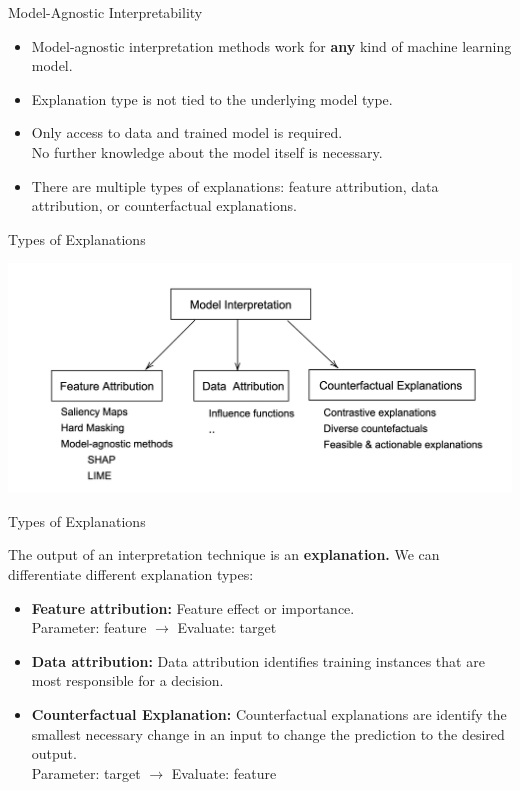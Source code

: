 \documentclass[11pt,compress,t,notes=noshow, xcolor=table]{beamer}
\begin{document}
\begin{vbframe}{Model-Agnostic Interpretability}
	\begin{itemize}
		\itemsep2em
		\item Model-agnostic interpretation methods work for \textbf{any} kind of machine learning model.
		\item Explanation type is not tied to the underlying model type.
		\item Only access to data and trained model is required.\\
		 No further knowledge about the model itself is necessary.
		\item There are multiple types of explanations: feature attribution, data attribution, or counterfactual explanations.
	\end{itemize}
\end{vbframe}


\begin{vbframe}{Types of Explanations}
	\begin{center}
		\includegraphics[width=\textwidth]{figure/1-attributions.png}
    \end{center}
\end{vbframe}



\begin{vbframe}{Types of Explanations}

	The output of an interpretation technique is an \textbf{explanation.} We can differentiate different explanation types:
    
    \bigskip
	\begin{itemize}

    \itemsep2em
	\item 
		\textbf{Feature attribution:} Feature effect or importance.
		\\
		\smallskip
		Parameter: feature $\rightarrow$ Evaluate: target
	
	\item 
		\textbf{Data attribution:} Data attribution identifies  training instances that are most responsible for a decision.

	\item 
	   \textbf{Counterfactual Explanation:} 
	   Counterfactual explanations are identify the smallest necessary change in an input to change the prediction to the desired output.
	   \\
		\smallskip
		Parameter: target $\rightarrow$ Evaluate: feature
	  
	\end{itemize}
	
\end{vbframe}
\end{document}
